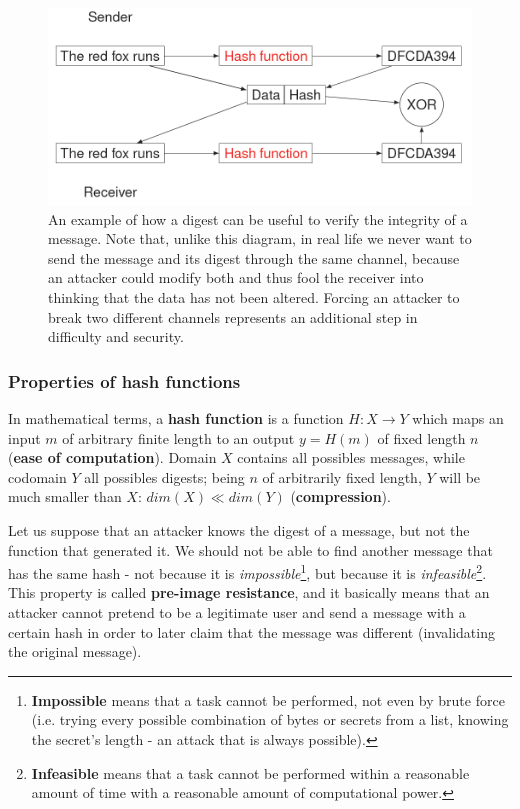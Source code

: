\begin{figure}[H]
\centering
\includegraphics[scale=0.4]{img/hash_AB.png}
\decoRule
\caption{An example of how a digest can be useful to verify the integrity of a message. Note that, unlike this diagram, in real life we never want to send the message and its digest through the same channel, because an attacker could modify both and thus fool the receiver into thinking that the data has not been altered. Forcing an attacker to break two different channels represents an additional step in difficulty and security.}
\label{fig:hashAB}
\end{figure}


\subsubsection{Properties of hash functions}
In mathematical terms, a \textbf{hash function} is a function $H : X \rightarrow Y$ which maps an input $m$ of arbitrary finite length to an output $y = H(m)$ of fixed length $n$ (\textbf{ease of computation}). Domain $X$ contains all possibles messages, while codomain $Y$ all possibles digests; being $n$ of arbitrarily fixed length, $Y$ will be much smaller than $X$: $dim(X) \ll dim(Y)$ (\textbf{compression}).

Let us suppose that an attacker knows the digest of a message, but not the function that generated it. We should not be able to find another message that has the same hash - not because it is \textit{impossible}\footnote{\textbf{Impossible} means that a task cannot be performed, not even by brute force (i.e. trying every possible combination of bytes or secrets from a list, knowing the secret's length - an attack that is always possible).}, but because it is \textit{infeasible}\footnote{\textbf{Infeasible} means that a task cannot be performed within a reasonable amount of time with a reasonable amount of computational power.}. This property is called \textbf{pre-image resistance}, and it basically means that an attacker cannot pretend to be a legitimate user and send a message with a certain hash in order to later claim that the message was different (invalidating the original message).


